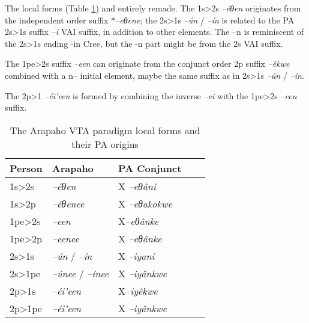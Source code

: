 \documentclass[twoside,a4paper,11pt]{article}
\newcommand{\ipa}[1]{{\phon\textit{#1}}}
\newcommand{\Σ}{\greek{Σ}}
\begin{document}
 
 The local forms (Table \ref{tab:vta.3}) and entirely remade. The 1s>2s  \ipa{--éθen} originates from the independent order suffix  *\ipa{--eθene}; the 2s>1s \ipa{--ún} / \ipa{--ín} is related to the PA 2s>1s suffix \ipa{--i}  VAI suffix, in addition to other elements. The --n is reminiscent of the 2s>1s ending -in Cree, but the -n part might be from the 2s  VAI suffix.
 
 The 1pe>2s suffix \ipa{--een} can originate from the conjunct order 2p suffix \ipa{--êkwe} combined with a n-- initial element, maybe the same suffix as in  2s>1s \ipa{--ún} / \ipa{--ín}.
 
The 2p>1 \ipa{--éi'een} is formed by combining the inverse  \ipa{--ei} with the 1pe>2s \ipa{--een} suffix.  


\begin{table}[H]
\caption{The Arapaho VTA paradigm local forms and their PA origins}
\centering \label{tab:vta.3}
\begin{tabular}{lllll}
\toprule
Person & Arapaho & PA Conjunct    \\
\midrule 
1s>2s& \ipa{--éθen} &X \ipa{--eθâni}   \\
1s>2p&\ipa{--éθenee} &X \ipa{--eθakokwe} & \\
1pe>2s&\ipa{--een} & X\ipa{--eθânke} &   \\
1pe>2p&\ipa{--eenee} &X \ipa{--eθânke} &   \\
\midrule 
2s>1s&\ipa{--ún} / \ipa{--ín} &  X \ipa{--iyani}     \\
2s>1pe&\ipa{--únee} / \ipa{--ínee} &  X \ipa{--iyânkwe} &  \\
2p>1s&\ipa{--éi'een} & X\ipa{--iyêkwe} &   \\
2p>1pe&\ipa{--éi'een} &X \ipa{--iyânkwe} &   \\
\bottomrule
\end{tabular}
\end{table}
%

 
 
\end{document}
